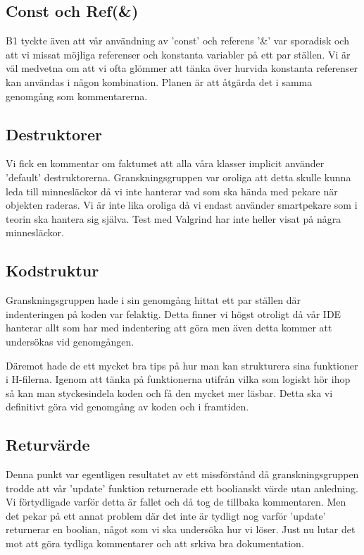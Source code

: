 \documentclass{TDP005mall}
\begin{document}
\subsection{Const och Ref(\&)}
B1 tyckte även att vår användning av 'const' och referens '\&' var sporadisk och att vi missat möjliga referenser och konstanta variabler på ett par ställen. Vi är väl medvetna om att vi ofta glömmer att tänka över hurvida konstanta referenser kan användas i någon kombination. Planen är att åtgärda det i samma genomgång som kommentarerna. 

\subsection{Destruktorer}
Vi fick en kommentar om faktumet att alla våra klasser implicit använder 'default' destruktorerna. Granskningsgruppen var oroliga att detta skulle kunna leda till minnesläckor då vi inte hanterar vad som ska hända med pekare när objekten raderas. Vi är inte lika oroliga då vi endast använder smartpekare som i teorin ska hantera sig själva. Test med Valgrind har inte heller visat på några minnesläckor.

\subsection{Kodstruktur}
Granskningsgruppen hade i sin genomgång hittat ett par ställen där indenteringen på koden var felaktig. Detta finner vi högst otroligt då vår IDE hanterar allt som har med indentering att göra men även detta kommer att undersökas vid genomgången.

Däremot hade de ett mycket bra tips på hur man kan strukturera sina funktioner i H-filerna. Igenom att tänka på funktionerna utifrån vilka som logiskt hör ihop så kan man styckesindela koden och få den mycket mer läsbar. Detta ska vi definitivt göra vid genomgång av koden och i framtiden.

\subsection{Returvärde}
Denna punkt var egentligen resultatet av ett missförstånd då granskningsgruppen trodde att vår 'update' funktion returnerade ett boolianskt värde utan anledning. Vi förtydligade varför detta är fallet och då tog de tillbaka kommentaren. Men det pekar på ett annat problem där det inte är tydligt nog varför 'update' returnerar en boolian, något som vi ska undersöka hur vi löser. Just nu lutar det mot att göra tydliga kommentarer och att srkiva bra dokumentation.
\end{document}

